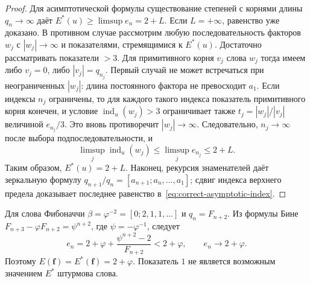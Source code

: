\begin{proof}
Для асимптотической формулы существование степеней с корнями
длины $q_n\to\infty$ даёт
$E^*(u)\ge\limsup e_n=2+L$.
Если $L=+\infty$, равенство уже доказано.
В противном случае рассмотрим любую последовательность факторов
$w_j$ с $|w_j|\to\infty$ и показателями, стремящимися к $E^*(u)$.
Достаточно рассматривать показатели $>3$.
Для примитивного корня $v_j$ слова $w_j$ тогда имеем
либо $v_j=0$, либо $|v_j|=q_{n_j}$.
Первый случай не может встречаться при неограниченных $|w_j|$:
длина постоянного фактора не превосходит $a_1$.
Если индексы $n_j$ ограничены, то для каждого такого индекса
показатель примитивного корня конечен, и условие
$\operatorname{ind}_u(w_j)>3$ ограничивает также
$t_j=|w_j|/|v_j|$ величиной $e_{n_j}/3$.
Это вновь противоречит $|w_j|\to\infty$.
Следовательно, $n_j\to\infty$ после выбора подпоследовательности, и
\[
 \limsup_j\operatorname{ind}_u(w_j)
 \le\limsup_j e_{n_j}\le2+L.
\]
Таким образом, $E^*(u)=2+L$.
Наконец, рекурсия знаменателей даёт зеркальную формулу
$q_{n+1}/q_n=[a_{n+1};a_n,\ldots,a_1]$;
сдвиг индекса верхнего предела доказывает последнее равенство
в~\eqref{eq:correct-asymptotic-index}.
\end{proof}

\noindent Для слова Фибоначчи
$\beta=\varphi^{-2}=[0;2,1,1,\ldots]$ и $q_n=F_{n+2}$.
Из формулы Бине
$F_{n+3}-\varphi F_{n+2}=\psi^{n+2}$, где $\psi=-\varphi^{-1}$,
следует
\[
 e_n=2+\varphi+\frac{\psi^{n+2}-2}{F_{n+2}}<2+\varphi,
 \qquad e_n\longrightarrow2+\varphi.
\]
Поэтому $E(\mathbf f)=E^*(\mathbf f)=2+\varphi$.
Показатель $1$ не является возможным значением $E^*$ штурмова слова.
